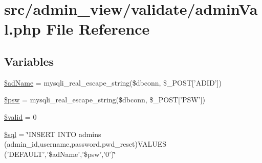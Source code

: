 \hypertarget{adminVal_8php}{\section{src/admin\-\_\-view/validate/admin\-Val.php \-File \-Reference}
\label{adminVal_8php}
}
\subsection*{\-Variables}
\begin{DoxyCompactItemize}
\item 
\hyperlink{adminVal_8php_a3f42272d7be6f25532b7b50ff79517fc}{\$ad\-Name} = mysqli\-\_\-real\-\_\-escape\-\_\-string(\$dbconn, \$\-\_\-\-P\-O\-S\-T\mbox{[}'\-A\-D\-I\-D'\mbox{]})
\item 
\hyperlink{adminVal_8php_a5b519c2c09881014890c26c8dc361242}{\$psw} = mysqli\-\_\-real\-\_\-escape\-\_\-string(\$dbconn, \$\-\_\-\-P\-O\-S\-T\mbox{[}'\-P\-S\-W'\mbox{]})
\item 
\hyperlink{adminVal_8php_a0587674d27d00ef497e08e53ccf45bbb}{\$valid} = 0
\item 
\hyperlink{adminVal_8php_a047170d6020a882807665812a27e2525}{\$sql} = \char`\"{}\-I\-N\-S\-E\-R\-T \-I\-N\-T\-O admins (admin\-\_\-id,username,password,pwd\-\_\-reset)\-V\-A\-L\-U\-E\-S ('\-D\-E\-F\-A\-U\-L\-T','\$ad\-Name','\$psw','0')\char`\"{}
\end{DoxyCompactItemize}


